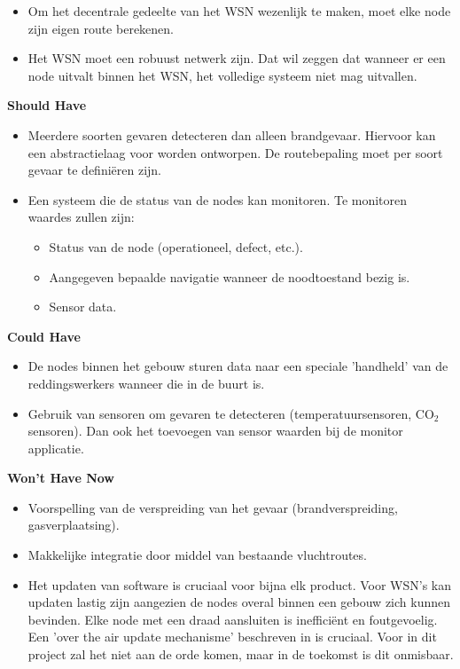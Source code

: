 \documentclass{../local}
\begin{document}
\begin{itemize}
\item Om het decentrale gedeelte van het WSN wezenlijk te maken, moet elke node zijn eigen route berekenen.

\item Het WSN moet een robuust netwerk zijn. Dat wil zeggen dat wanneer er een node uitvalt binnen het WSN, het volledige systeem niet mag uitvallen.
\end{itemize}

\noindent\textbf{Should Have}
\begin{itemize}
\item Meerdere soorten gevaren detecteren dan alleen brandgevaar. Hiervoor kan een abstractielaag voor worden ontworpen. De routebepaling moet per soort gevaar te definiëren zijn.
\item Een systeem die de status van de nodes kan monitoren. Te monitoren waardes zullen zijn:
\begin{itemize}
\item Status van de node (operationeel, defect, etc.).
\item Aangegeven bepaalde navigatie wanneer de noodtoestand bezig is.
\item Sensor data.
\end{itemize}
\end{itemize}

\noindent\textbf{Could Have}
\begin{itemize}
\item De nodes binnen het gebouw sturen data naar een speciale 'handheld' van de reddingswerkers wanneer die in de buurt is.
\item Gebruik van sensoren om gevaren te detecteren (temperatuursensoren, CO$_{2}$ sensoren). Dan ook het toevoegen van sensor waarden bij de monitor applicatie.
\end{itemize}

\noindent\textbf{Won't Have Now}
\begin{itemize}
\item Voorspelling van de verspreiding van het gevaar (brandverspreiding, gasverplaatsing).
\item Makkelijke integratie door middel van bestaande vluchtroutes.
\item Het updaten van software is cruciaal voor bijna elk product. Voor WSN's kan updaten lastig zijn aangezien de nodes overal binnen een gebouw zich kunnen bevinden. Elke node met een draad aansluiten is inefficiënt en foutgevoelig. Een 'over the air update mechanisme' beschreven in \cite{StatRUP} is cruciaal. Voor in dit project zal het niet aan de orde komen, maar in de toekomst is dit onmisbaar.
\end{itemize}
\end{document}
